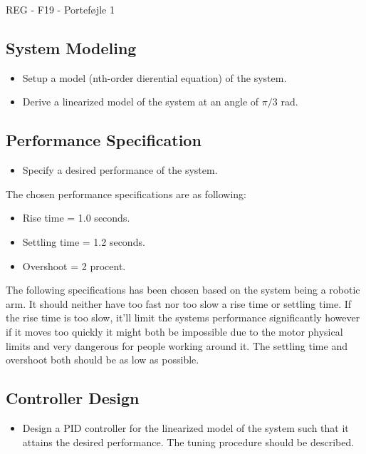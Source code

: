 \documentclass[12pt]{article}
\begin{document}
\raggedright
\huge
REG - F19 - Porteføjle 1 \linebreak
\normalsize


\subsection*{System Modeling}
\begin{itemize}
  \item Setup a model (nth-order dierential equation) of the system.
  \item Derive a linearized model of the system at an angle of $\pi/3$ rad.
\end{itemize}

\subsection*{Performance Specification}

\begin{itemize}
  \item Specify a desired performance of the system.
\end{itemize}
The chosen performance specifications are as following:
\begin{itemize}
  \item Rise time = 1.0 seconds.
  \item Settling time = 1.2 seconds.
  \item Overshoot = 2 procent.
\end{itemize}
 The following specifications has been chosen based on the system being a robotic arm. It should neither have too fast nor too slow a rise time or settling time. If the rise time is too slow, it'll limit the systems performance significantly however if it moves too quickly it might both be impossible due to the motor physical limits and very dangerous for people working around it. The settling time and overshoot both should be as low as possible.
\subsection*{Controller Design}
\begin{itemize}
  \item Design a PID controller for the linearized model of the system such that it attains the desired performance. The tuning procedure should be described.
\end{itemize}
\end{document}
